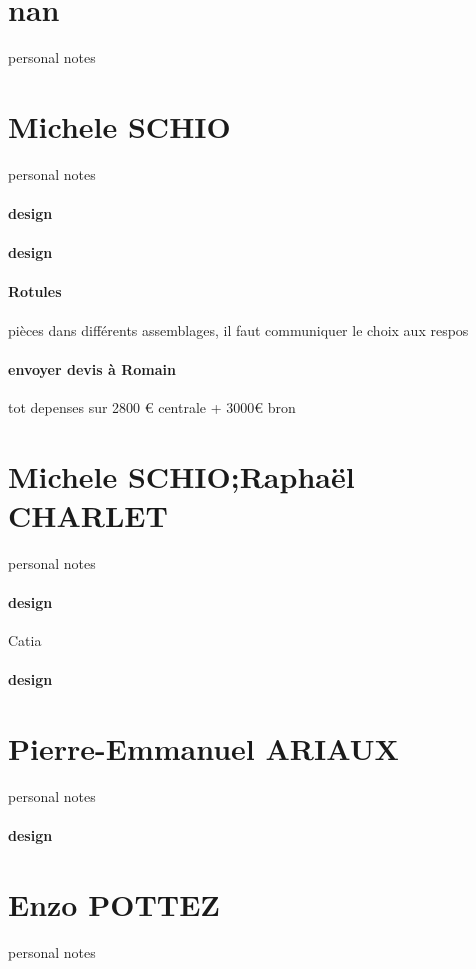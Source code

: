 \newpage \section*{nan} 
 \par personal notes
\newpage \section*{Michele SCHIO} 
 \par personal notes
\paragraph{design} 
\paragraph{design} 
\paragraph{Rotules} pièces dans différents assemblages, il faut communiquer le choix aux respos
\paragraph{envoyer devis à Romain} tot depenses sur 2800 € centrale + 3000€ bron
\newpage \section*{Michele SCHIO;Raphaël CHARLET} 
 \par personal notes
\paragraph{design} Catia

\paragraph{design} 
\newpage \section*{Pierre-Emmanuel ARIAUX} 
 \par personal notes
\paragraph{design} 
\newpage \section*{Enzo POTTEZ} 
 \par personal notes
